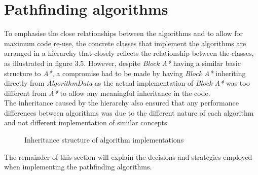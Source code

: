 \documentclass[12pt,notitlepage]{report}
\begin{document}
\section{Pathfinding algorithms}
To emphasise the close relationships between the algorithms and to allow for maximum code re-use, the concrete classes that implement the algorithms are arranged in a hierarchy that closely reflects the relationship between the classes, as illustrated in figure 3.5. However, despite {\em Block A*} having a similar basic structure to {\em A*}, a compromise had to be made by having {\em Block A*} inheriting directly from {\em AlgorithmData} as the actual implementation of {\em Block A*} was too different from {\em A*} to allow any meaningful inheritance in the code.\\

\noindent
The inheritance caused by the hierarchy also ensured that any performance differences between algorithms was due to the different nature of each algorithm and not different implementation of similar concepts.\\

\begin{figure}
\centering
{}
\caption{Inheritance structure of algorithm implementations}
\end{figure}

\noindent
The remainder of this section will explain the decisions and strategies employed when implementing the pathfinding algorithms.
\end{document}
